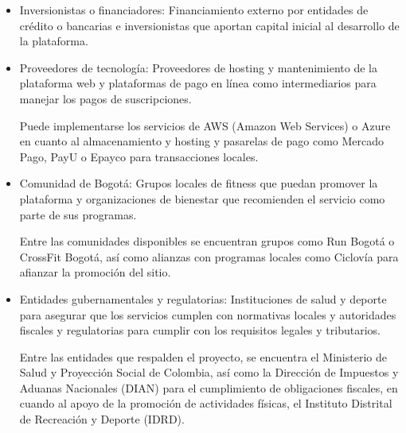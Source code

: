 {\begin{itemize}
    \item Inversionistas o financiadores: Financiamiento externo por entidades de crédito o bancarias e inversionistas que aportan capital inicial al desarrollo de la plataforma.     
    
    \item Proveedores de tecnología: Proveedores de hosting y mantenimiento de la plataforma web y plataformas de pago en línea como intermediarios para manejar los pagos de suscripciones. 

    Puede implementarse los servicios de AWS (Amazon Web Services) o Azure en cuanto al almacenamiento y hosting y pasarelas de pago como Mercado Pago, PayU o Epayco para transacciones locales. 

     \item Comunidad de Bogotá: Grupos locales de fitness que puedan promover la plataforma y organizaciones de bienestar que recomienden el servicio como parte de sus programas. 

     Entre las comunidades disponibles se encuentran grupos como Run Bogotá o CrossFit Bogotá, así como alianzas con programas locales como Ciclovía para afianzar la promoción del sitio. 

     \item Entidades gubernamentales y regulatorias: Instituciones de salud y deporte para asegurar que los servicios cumplen con normativas locales y autoridades fiscales y regulatorias para cumplir con los requisitos legales y tributarios. 

     Entre las entidades que respalden el proyecto, se encuentra el Ministerio de Salud y Proyección Social de Colombia, así como la Dirección de Impuestos y Aduanas Nacionales (DIAN) para el cumplimiento de obligaciones fiscales, en cuando al apoyo de la promoción de actividades físicas, el Instituto Distrital de Recreación y Deporte (IDRD). 

\end{itemize}


}